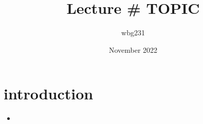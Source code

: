 \documentclass{article}
\title{Lecture # TOPIC}
\author{wbg231 }
\date{November 2022}
\begin{document}
\maketitle

\section{introduction}
\begin{itemize}
\item
\end{itemize}
\end{document}
